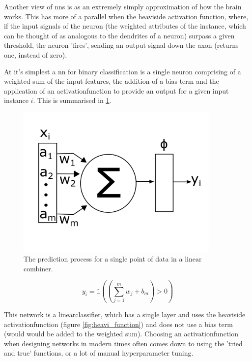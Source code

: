 Another view of \gls{nn}s is as an extremely simply approximation of how the brain works. This has more of a parallel when the heaviside activation function, where, if the input signals of the neuron (the weighted attributes of the \gls{instance}, which can be thought of as analogous to the dendrites of a neuron) surpass a given threshold, the neuron 'fires', sending an output signal down the axon (returns one, instead of zero).
\bigskip

At it's simplest a \gls{nn} for binary classification is a single \gls{neuron} comprising of a weighted sum of the input features, the addition of a bias term and the application of an \gls{activationfunction} to provide an output for a given input \gls{instance} $i$. This is summarised in \ref{fig:nn_simple}. 

\begin{figure}
    \centering
    \includegraphics[width=100mm]{figs/nn_simple.png}
    \caption{The prediction process for a single point of data in a linear combiner.}
    \label{fig:nn_simple}
\end{figure}

\begin{equation}
    y_i = \mathds{1} ((\sum_{j = 1}^m w_j + b_m) > 0)
    \label{eq:nn_simple_pred}
\end{equation}

This network is a \gls{linearclassifier}, which has a single \gls{layer} and uses the heaviside \gls{activationfunction} (figure \ref{fig:heavi_function}) and does not use a bias term (would would be added to the weighted sum). Choosing an \gls{activationfunction} when designing networks in modern times often comes down to using the 'tried and true' functions, or a lot of manual \gls{hyperparameter} tuning.

